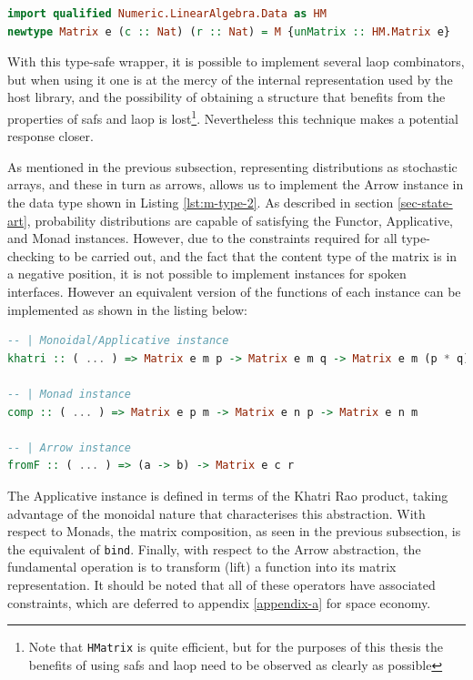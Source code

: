 \documentclass[
  oneside,
  11pt, a4paper,
  footinclude=true,
  headinclude=true,
  cleardoublepage=empty
]{scrbook}
\theoremstyle{definition}
\theoremstyle{definition}
\begin{document}
        \begin{lstlisting}[language=Haskell, label={lst:m-type-2}, caption={Type-safe wrapper around HMatrix},captionpos=b]
import qualified Numeric.LinearAlgebra.Data as HM
newtype Matrix e (c :: Nat) (r :: Nat) = M {unMatrix :: HM.Matrix e}
        \end{lstlisting}{}
        
        With this type-safe wrapper, it is possible to implement several \gls{laop} combinators, but when using it one is at the mercy of the internal representation used by the host library, and the possibility of obtaining a structure that benefits from the properties of \glspl{saf} and \gls{laop} is lost\footnote{Note that \texttt{HMatrix} is quite efficient, but for the purposes of this thesis the benefits of using \glspl{saf} and \gls{laop} need to be observed as clearly as possible}. Nevertheless this technique makes a potential response closer.
        
        As mentioned in the previous subsection, representing distributions as stochastic arrays, and these in turn as arrows, allows us to implement the Arrow instance in the data type shown in Listing \ref{lst:m-type-2}. As described in section \ref{sec-state-art}, probability distributions are capable of satisfying the Functor, Applicative, and Monad instances. However, due to the constraints required for all type-checking to be carried out, and the fact that the content type of the matrix is in a negative position, it is not possible to implement instances for spoken interfaces. However an equivalent version of the functions of each instance can be implemented as shown in the listing below:
        
        \begin{lstlisting}[language=Haskell, caption={Interface equivalent function implementations},captionpos=b]
-- | Monoidal/Applicative instance
khatri :: ( ... ) => Matrix e m p -> Matrix e m q -> Matrix e m (p * q)

-- | Monad instance
comp :: ( ... ) => Matrix e p m -> Matrix e n p -> Matrix e n m

-- | Arrow instance
fromF :: ( ... ) => (a -> b) -> Matrix e c r
        \end{lstlisting}{}
        
        The Applicative instance is defined in terms of the Khatri Rao product, taking advantage of the monoidal nature that characterises this abstraction. With respect to Monads, the matrix composition, as seen in the previous subsection, is the equivalent of \texttt{bind}. Finally, with respect to the Arrow abstraction, the fundamental operation is to transform (lift) a function into its matrix representation. It should be noted that all of these operators have associated constraints, which are deferred to appendix \ref{appendix-a} for space economy.
        
\end{document}
